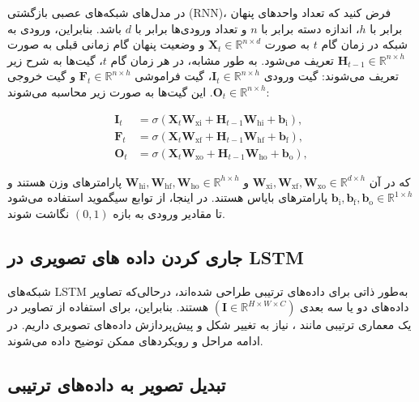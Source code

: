 در مدل‌های شبکه‌های عصبی بازگشتی (RNN)، فرض کنید که تعداد واحدهای پنهان برابر با \( h \)، اندازه دسته برابر با \( n \) و تعداد ورودی‌ها برابر با \( d \) باشد. بنابراین، ورودی به شبکه در زمان گام \( t \) به صورت \( \mathbf{X}_t \in \mathbb{R}^{n \times d} \) و وضعیت پنهان گام زمانی قبلی به صورت \( \mathbf{H}_{t-1} \in \mathbb{R}^{n \times h} \) تعریف می‌شود. به طور مشابه، در هر زمان گام \( t \)، گیت‌ها به شرح زیر تعریف می‌شوند: گیت ورودی \( \mathbf{I}_t \in \mathbb{R}^{n \times h} \)، گیت فراموشی \( \mathbf{F}_t \in \mathbb{R}^{n \times h} \) و گیت خروجی \( \mathbf{O}_t \in \mathbb{R}^{n \times h} \). این گیت‌ها به صورت زیر محاسبه می‌شوند:

\[
\begin{aligned}
	\mathbf{I}_t &= \sigma(\mathbf{X}_t \mathbf{W}_{\textrm{xi}} + \mathbf{H}_{t-1} \mathbf{W}_{\textrm{hi}} + \mathbf{b}_\textrm{i}),\\
	\mathbf{F}_t &= \sigma(\mathbf{X}_t \mathbf{W}_{\textrm{xf}} + \mathbf{H}_{t-1} \mathbf{W}_{\textrm{hf}} + \mathbf{b}_\textrm{f}),\\
	\mathbf{O}_t &= \sigma(\mathbf{X}_t \mathbf{W}_{\textrm{xo}} + \mathbf{H}_{t-1} \mathbf{W}_{\textrm{ho}} + \mathbf{b}_\textrm{o}),
\end{aligned}
\]

که در آن \( \mathbf{W}_{\textrm{xi}}, \mathbf{W}_{\textrm{xf}}, \mathbf{W}_{\textrm{xo}} \in \mathbb{R}^{d \times h} \) و \( \mathbf{W}_{\textrm{hi}}, \mathbf{W}_{\textrm{hf}}, \mathbf{W}_{\textrm{ho}} \in \mathbb{R}^{h \times h} \) پارامترهای وزن هستند و \( \mathbf{b}_\textrm{i}, \mathbf{b}_\textrm{f}, \mathbf{b}_\textrm{o} \in \mathbb{R}^{1 \times h} \) پارامترهای بایاس هستند. در اینجا، از توابع سیگموید استفاده می‌شود تا مقادیر ورودی به بازه \( (0, 1) \) نگاشت شوند.


\subsection{جاری کردن داده های تصویری در LSTM}


شبکه‌های LSTM به‌طور ذاتی برای داده‌های ترتیبی طراحی شده‌اند، درحالی‌که تصاویر داده‌های دو یا سه بعدی \((\mathbf{I} \in \mathbb{R}^{H \times W \times C})\) هستند. بنابراین، برای استفاده از تصاویر در یک معماری ترتیبی مانند ، نیاز به تغییر شکل و پیش‌پردازش داده‌های تصویری داریم. در ادامه مراحل و رویکردهای ممکن توضیح داده می‌شوند.

\subsection{تبدیل تصویر به داده‌های ترتیبی}

